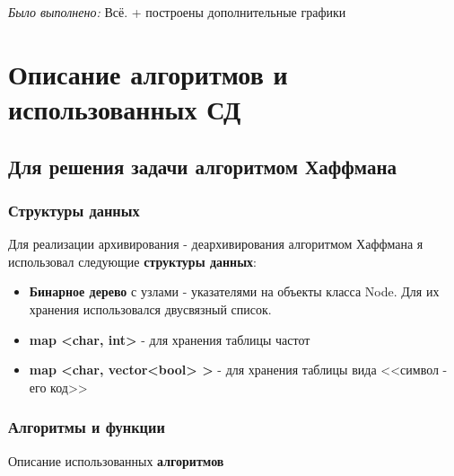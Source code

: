 \documentclass[russian, a4paper, 12pt]{article}
\begin{document}
\textit{Было выполнено: } Всё. + построены дополнительные графики
\newpage
\section{Описание алгоритмов и использованных СД}
\subsection{Для решения задачи алгоритмом Хаффмана}

\subsubsection{Структуры данных}
Для реализации архивирования - деархивирования алгоритмом Хаффмана я использовал
следующие \textbf{структуры данных}:
\begin{itemize}
  \item \textbf{Бинарное дерево} с узлами - указателями на объекты класса Node.
  Для их хранения использовался двусвязный список.
  \item \textbf{map <char, int>} - для хранения таблицы частот
  \item \textbf{map <char, vector<bool> >} - для хранения таблицы вида <<символ - его код>>
\end{itemize}

\subsubsection{Алгоритмы и функции}
Описание использованных \textbf{алгоритмов}
\end{document}
